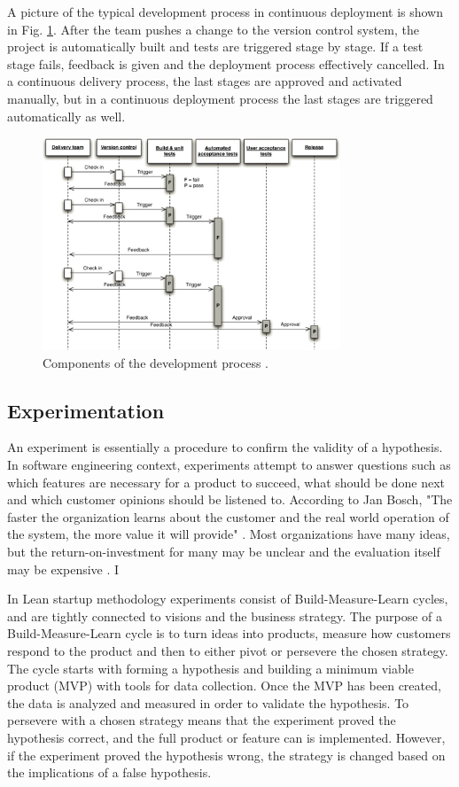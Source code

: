 \documentclass[conference]{IEEEtran}
\begin{document}
A picture of the typical development process in continuous deployment is shown in Fig. \ref{fig3}. After the team pushes a change to the version control system, the project is automatically built and tests are triggered stage by stage. If a test stage fails, feedback is given and the deployment process effectively cancelled. In a continuous delivery process, the last stages are approved and activated manually, but in a continuous deployment process the last stages are triggered automatically as well.

\begin{figure}[!t]
	\centering
	\includegraphics[width=3.5in]{developmentprocess.jpg}
	\caption{Components of the development process \cite{cdbook}.}
	\label{fig3}
\end{figure}

\subsection{Experimentation}

An experiment is essentially a procedure to confirm the validity of a hypothesis. In software engineering context, experiments attempt to answer questions such as which features are necessary for a product to succeed, what should be done next and which customer opinions should be listened to. According to Jan Bosch, "The faster the organization learns about the customer and the real world operation of the system, the more value it will provide" \cite{bosch2012building}. Most organizations have many ideas, but the return-on-investment for many may be unclear and the evaluation itself may be expensive \cite{kohavi2007practical}. I

In Lean startup methodology \cite{ries2011lean} experiments consist of Build-Measure-Learn cycles, and are tightly connected to visions and the business strategy. The purpose of a Build-Measure-Learn cycle is to turn ideas into products, measure how customers respond to the product and then to either pivot or persevere the chosen strategy. The cycle starts with forming a hypothesis and building a minimum viable product (MVP) with tools for data collection. Once the MVP has been created, the data is analyzed and measured in order to validate the hypothesis. To persevere with a chosen strategy means that the experiment proved the hypothesis correct, and the full product or feature can is implemented. However, if the experiment proved the hypothesis wrong, the strategy is changed based on the implications of a false hypothesis.
\end{document}
